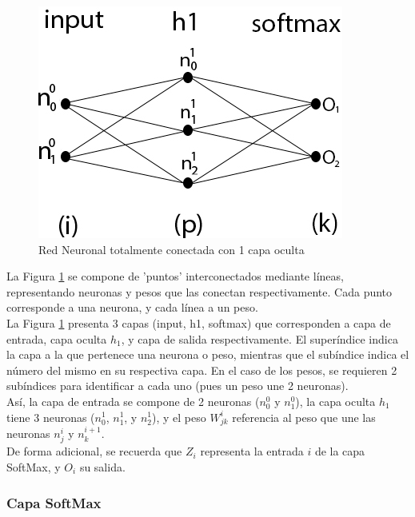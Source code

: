 \begin{figure}[H]
	\centering
	\includegraphics[scale=0.35]{imagenes/nn_1_capa.jpg}  
	\caption{Red Neuronal totalmente conectada con 1 capa oculta}
	\label{fig:nn_1_capa}
\end{figure}

La Figura \ref{fig:nn_1_capa} se compone de 'puntos' interconectados mediante líneas, representando neuronas y pesos que las conectan respectivamente. Cada punto corresponde a una neurona, y cada línea a un peso. \\
La Figura \ref{fig:nn_1_capa} presenta 3 capas (input, h1, softmax) que corresponden a capa de entrada, capa oculta $h_1$, y capa de salida respectivamente. El superíndice indica la capa a la que pertenece una neurona o peso, mientras que el subíndice indica el número del mismo en su respectiva capa. En el caso de los pesos, se requieren 2 subíndices para identificar a cada uno (pues un peso une 2 neuronas). \\
Así, la capa de entrada se compone de 2 neuronas ($n^{0}_0$ y $n^{0}_1$), la capa oculta $h_1$ tiene 3 neuronas ($n^1_{0}$, $n^1_{1}$, y $n^1_{2}$), y el peso $W^{i}_{jk}$ referencia al peso que une las neuronas $n^{i}_j$ y $n^{i+1}_k$.\\
De forma adicional, se recuerda que $Z_i$ representa la entrada $i$ de la capa SoftMax, y $O_i$ su salida.  

\subsubsection{Capa SoftMax}

